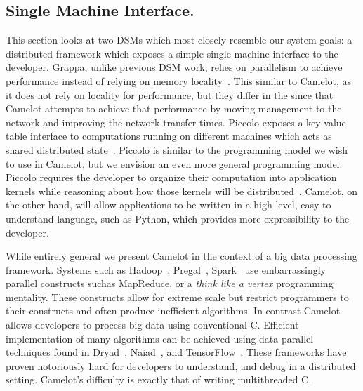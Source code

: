 \subsection{Single Machine Interface.} This section looks at two DSMs which most
closely resemble our system goals: a distributed framework which exposes a
simple single machine interface to the developer. Grappa, unlike previous DSM
work, relies on parallelism to achieve performance instead of relying on memory
locality~\cite{Nelson2015}. This similar to Camelot, as it does not rely on
locality for performance, but they differ in the since that Camelot attempts to
achieve that performance by moving management to the network and improving the
network transfer times. Piccolo exposes a key-value table interface to
computations running on different machines which acts as shared distributed
state~\cite{piccolo}. Piccolo is similar to the programming model we wish to use
in Camelot, but we envision an even more general programming model. Piccolo
requires the developer to organize their computation into application kernels
while reasoning about how those kernels will be distributed~\cite{piccolo}.
Camelot, on the other hand, will allow applications to be written in a
high-level, easy to understand language, such as Python, which provides more
expressibility to the developer.	

While entirely general we present Camelot in the context of a big data
processing framework. Systems such as Hadoop~\cite{Dean2004}, Pregal~\cite{Malewicz:2010:PSL:1807167.1807184}, 
Spark~\cite{180560} use embarrassingly parallel constructs suchas MapReduce, or
a \textit{think like a vertex} programming mentality. These constructs allow for
extreme scale but restrict programmers to their constructs and often produce
inefficient algorithms. In contrast Camelot allows developers to process big
data using conventional C. Efficient implementation of many algorithms can be
achieved using data parallel techniques found in Dryad~\cite{Isard:2007:DDD:1272996.1273005},
Naiad~\cite{Murray2013}, and TensorFlow~\cite{tensorflow2015-whitepaper}. These
frameworks have proven notoriously hard for developers to understand, and debug
in a distributed setting. Camelot's difficulty is exactly that of writing
multithreaded C.
